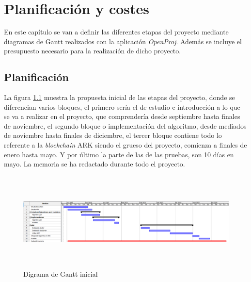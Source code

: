 \chapter{Planificación y costes}


En este capítulo se van a definir las diferentes etapas del proyecto mediante diagramas de Gantt realizados con la aplicación \textit{OpenProj}. Además se incluye el presupuesto necesario para la realización de dicho proyecto.

\section{Planificación}

La figura \ref{fig:gantt-ini} muestra la propuesta inicial de las etapas del proyecto, donde se diferencian varios bloques, el primero sería el de estudio e introducción a lo que se va a realizar en el proyecto, que comprendería desde septiembre hasta finales de noviembre, el segundo bloque o implementación del algoritmo, desde mediados de noviembre hasta finales de diciembre, el tercer bloque contiene todo lo referente a la \textit{blockchain} ARK siendo el grueso del proyecto, comienza a finales de enero hasta mayo. Y por último la parte de las de las pruebas, son 10 días en mayo. La memoria se ha redactado durante todo el proyecto.

\begin{figure}[h]
	\centering
	\includegraphics[width=15cm,height=5cm]{figuras/Gantt_ini.png}
	\caption{Digrama de Gantt inicial}
	\label{fig:gantt-ini}
\end{figure}

